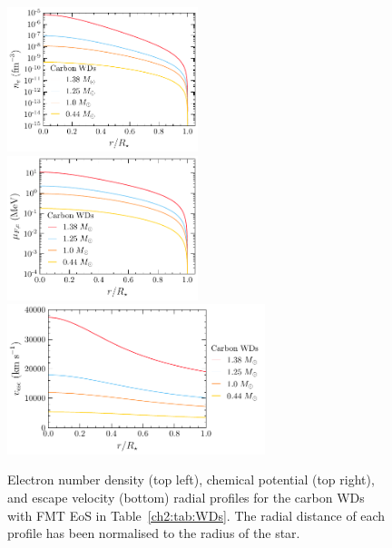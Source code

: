 \begin{figure}[t!bp]
    \centering
    \includegraphics[width = 0.495\textwidth]{ne_prof.pdf}  
    \includegraphics[width = 0.495\textwidth]{muFe_prof.pdf}  
    \includegraphics[width = 0.67\textwidth]{vesc_prof.pdf}
    \caption{Electron number density (top left), chemical potential (top right), and escape velocity (bottom) radial profiles for the carbon WDs with FMT EoS in Table~\ref{ch2:tab:WDs}. The radial distance of each profile has been normalised to the radius of the star.}
    \label{ch2:fig:WDradprofs}
\end{figure}


